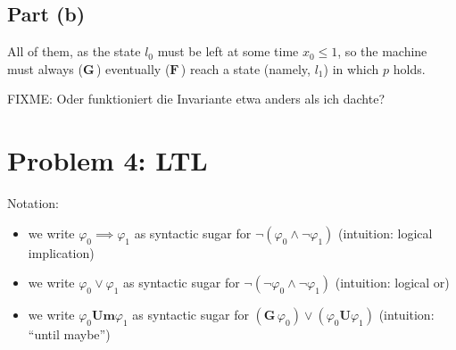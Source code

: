 \documentclass[a4paper,parskip,headheight=38pt]{scrartcl} %
\newcommand{\ltlbinop}[1]{\mathbin{\ensuremath{\mathbf{{#1}}}}}
\newcommand{\ltlunop}[1]{\mathopen{\ensuremath{\mathbf{{#1}}}}\,}
\newcommand{\ltlG}{\ltlunop{G}}
\newcommand{\ltlF}{\ltlunop{F}}
\newcommand{\ltlU}{\ltlbinop{U}}
\newcommand{\ltlUm}{\ltlbinop{Um}}
\begin{document}
\subsection*{Part (b)}

All of them, as the state $l_0$ must be left at some time $x_0 \leq 1$,
so the machine must always ($\ltlG{}$) eventually ($\ltlF{}$) reach a
state (namely, $l_1$) in which $p$ holds.

FIXME: Oder funktioniert die Invariante etwa anders als ich dachte?

\section*{Problem 4: LTL}

Notation:
\begin{itemize}
    \item we write $\varphi_0 \implies \varphi_1$ as syntactic sugar for $\neg(\varphi_0 \land \neg \varphi_1)$ (intuition: logical implication)
    \item we write $\varphi_0 \lor \varphi_1$ as syntactic sugar for $\neg(\neg\varphi_0 \land \neg\varphi_1)$ (intuition: logical or)
    \item we write $\varphi_0 \ltlUm \varphi_1$ as syntactic sugar for $(\ltlG{} \varphi_0) \lor (\varphi_0 \ltlU \varphi_1)$ (intuition: \enquote{until maybe})
\end{itemize}
\end{document}

